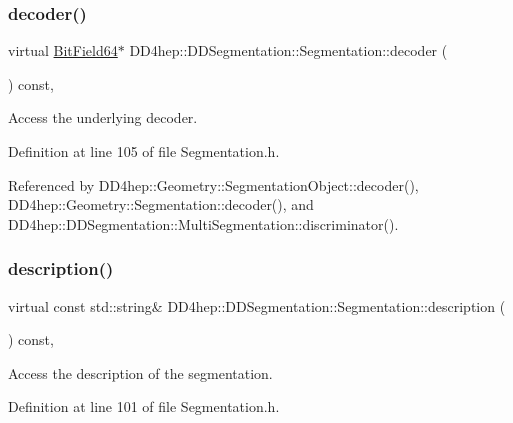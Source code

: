 \subsubsection{\texorpdfstring{decoder()}{decoder()}}
{\footnotesize\ttfamily virtual \hyperlink{class_d_d4hep_1_1_d_d_segmentation_1_1_bit_field64}{Bit\+Field64}$\ast$ D\+D4hep\+::\+D\+D\+Segmentation\+::\+Segmentation\+::decoder (\begin{DoxyParamCaption}{ }\end{DoxyParamCaption}) const\hspace{0.3cm}{\ttfamily [inline]}, {\ttfamily [virtual]}}



Access the underlying decoder. 



Definition at line 105 of file Segmentation.\+h.



Referenced by D\+D4hep\+::\+Geometry\+::\+Segmentation\+Object\+::decoder(), D\+D4hep\+::\+Geometry\+::\+Segmentation\+::decoder(), and D\+D4hep\+::\+D\+D\+Segmentation\+::\+Multi\+Segmentation\+::discriminator().

\hypertarget{class_d_d4hep_1_1_d_d_segmentation_1_1_segmentation_a99589a80a0ca6afaf1562b174fcd8cb5}{}\label{class_d_d4hep_1_1_d_d_segmentation_1_1_segmentation_a99589a80a0ca6afaf1562b174fcd8cb5} 
\subsubsection{\texorpdfstring{description()}{description()}}
{\footnotesize\ttfamily virtual const std\+::string\& D\+D4hep\+::\+D\+D\+Segmentation\+::\+Segmentation\+::description (\begin{DoxyParamCaption}{ }\end{DoxyParamCaption}) const\hspace{0.3cm}{\ttfamily [inline]}, {\ttfamily [virtual]}}



Access the description of the segmentation. 



Definition at line 101 of file Segmentation.\+h.



